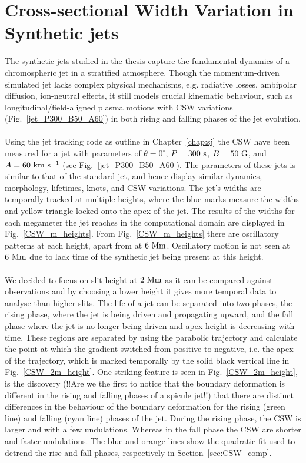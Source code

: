 \documentclass[12pt]{ociamthesis}
\newcommand{\kms}{~\rm{km ~s^{-1}}}
\newcommand{\np}{\\ \\}
\newcommand{\degs}{^{\circ}}
\begin{document}
\section{Cross-sectional Width Variation in Synthetic jets}
\label{sec:CSW_syn_jet}
The synthetic jets studied in the thesis capture the fundamental dynamics of a chromospheric jet in a stratified atmosphere. Though the momentum-driven simulated jet lacks complex physical mechanisms, e.g. radiative losses, ambipolar diffusion, ion-neutral effects, it still models crucial kinematic behaviour, such as longitudinal/field-aligned plasma motions with CSW variations (Fig.~\ref{jet_P300_B50_A60}) in both rising and falling phases of the jet evolution. \np
%
Using the jet tracking code as outline in Chapter~\ref{chap:sj} the CSW have been measured for a jet with parameters of $\theta =0\degs$, $P=300~\rm{s}$, $B=50~\rm{G}$, and $A=60\kms$ (see Fig.~\ref{jet_P300_B50_A60}). The parameters of these jets is similar to that of the standard jet, and hence display similar dynamics, morphology, lifetimes, knots, and CSW variations. The jet's widths are temporally tracked at multiple heights, where the blue marks measure the widths and yellow triangle locked onto the apex of the jet. The results of the widths for each megameter the jet reaches in the computational domain are displayed in Fig.~\ref{CSW_m_heights}. From Fig.~\ref{CSW_m_heights} there are oscillatory patterns at each height, apart from at $6~\rm{Mm}$. Oscillatory motion is not seen at $6~\rm{Mm}$ due to lack time of the synthetic jet being present at this height. \np
%
We decided to focus on slit height at $2~\rm{Mm}$ as it can be compared against observations and by choosing a lower height it gives more temporal data to analyse than higher slits. The life of a jet can be separated into two phases, the rising phase, where the jet is being driven and propagating upward, and the fall phase where the jet is no longer being driven and apex height is decreasing with time. These regions are separated by using the parabolic trajectory and calculate the point at which the gradient switched from positive to negative, i.e. the apex of the trajectory, which is marked temporally by the solid black vertical line in Fig.~\ref{CSW_2m_height}. One striking feature is seen in Fig.~\ref{CSW_2m_height}, is the discovery ({\color{green}!!Are we the first to notice that the boundary deformation is different in the rising and falling phases of a spicule jet!!}) that there are distinct differences in the behaviour of the boundary deformation for the rising (green line) and falling (cyan line) phases of the jet. During the rising phase, the CSW is larger and with a few undulations. Whereas in the fall phase the CSW are shorter and faster undulations. The blue and orange lines show the quadratic fit used to detrend the rise and fall phases, respectively in Section~\ref{sec:CSW_comp}.
\end{document}
